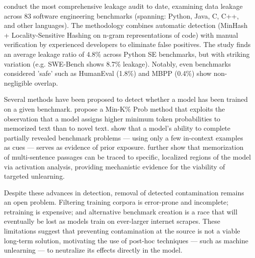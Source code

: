 \documentclass[mscthesis]{usiinfthesis}
\begin{document}
\par\vspace{1em}
\citet{zhou2025lessleakbenchinvestigationdataleakage} conduct the most comprehensive leakage audit to date, examining data leakage across 83 software engineering benchmarks (spanning: Python, Java, C, C++, and other languages). The methodology combines automatic detection (MinHash + Locality-Sensitive Hashing on n-gram representations of code) with manual verification by experienced developers to eliminate false positives. The study finds an average leakage ratio of 4.8\% across Python SE benchmarks, but with striking variation (e.g. SWE-Bench shows 8.7\% leakage). Notably, even benchmarks considered 'safe' such as HumanEval (1.8\%) and MBPP (0.4\%) show non-negligible overlap.
\par\vspace{1em}
Several methods have been proposed to detect whether a model has been trained on a given benchmark. \citet{shi2024detectingpretrainingdatalarge} propose a Min-K\% Prob method that exploits the observation that a model assigns higher minimum token probabilities to memorized text than to novel text. \citet{zawalski2025detectingdatacontaminationllms} show that a model's ability to complete partially revealed benchmark problems — using only a few in-context examples as cues — serves as evidence of prior exposure. \citet{stoehr2024localizingparagraphmemorizationlanguage} further show that memorization of multi-sentence passages can be traced to specific, localized regions of the model via activation analysis, providing mechanistic evidence for the viability of targeted unlearning.
\par\vspace{1em}
Despite these advances in detection, removal of detected contamination remains an open problem. Filtering training corpora is error-prone and incomplete; retraining is expensive; and alternative benchmark creation is a race that will eventually be lost as models train on ever-larger internet scrapes. These limitations suggest that preventing contamination at the source is not a viable long-term solution, motivating the use of post-hoc techniques — such as machine unlearning — to neutralize its effects directly in the model.
\end{document}
